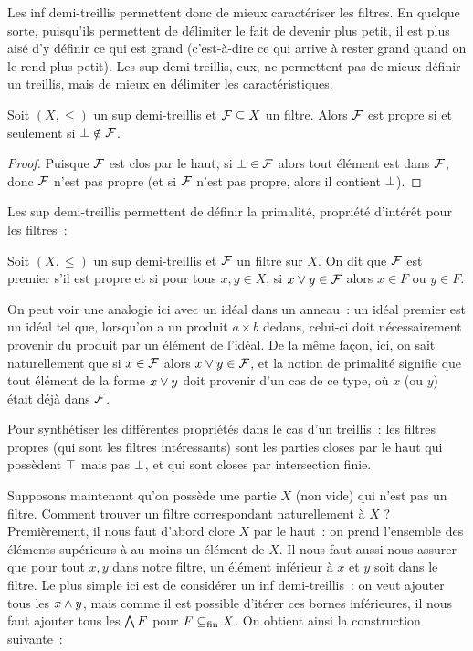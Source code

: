Les inf demi-treillis permettent donc de mieux caractériser les filtres. En
quelque sorte, puisqu'ils permettent de délimiter le fait de devenir plus petit,
il est plus aisé d'y définir ce qui est grand (c'est-à-dire ce qui arrive à
rester grand quand on le rend plus petit). Les sup demi-treillis, eux, ne
permettent pas de mieux définir un treillis, mais de mieux en délimiter les
caractéristiques.

\begin{property}
  Soit $(X,\leq)$ un sup demi-treillis et $\mathcal{F} \subseteq X$ un filtre.
  Alors $\mathcal{F}$ est propre si et seulement si $\bot\notin\mathcal{F}$.
\end{property}

\begin{proof}
  Puisque $\mathcal{F}$ est clos par le haut, si $\bot\in\mathcal{F}$ alors tout
  élément est dans $\mathcal{F}$, donc $\mathcal{F}$ n'est pas propre (et si
  $\mathcal{F}$ n'est pas propre, alors il contient $\bot$).
\end{proof}

\noindent
Les sup demi-treillis permettent de définir la primalité, propriété d'intérêt
pour les filtres~:

\begin{definition}
  Soit $(X,\leq)$ un sup demi-treillis et $\mathcal{F}$ un filtre sur $X$. On dit
  que $\mathcal{F}$ est premier s'il est propre et si pour tous $x,y\in X$, si
  $x\vee y \in \mathcal{F}$ alors $x\in F$ ou $y\in F$.
\end{definition}

On peut voir une analogie ici avec un idéal dans un anneau~: un idéal premier
est un idéal tel que, lorsqu'on a un produit $a\times b$ dedans, celui-ci doit
nécessairement provenir du produit par un élément de l'idéal. De la même façon,
ici, on sait naturellement que si $x\in\mathcal{F}$ alors
$x\vee y \in\mathcal{F}$, et la notion de primalité signifie que tout élément de
la forme $x\vee y$ doit provenir d'un cas de ce type, où $x$ (ou $y$) était
déjà dans $\mathcal{F}$.

Pour synthétiser les différentes propriétés dans le cas d'un treillis~: les
filtres propres (qui sont les filtres intéressants) sont les parties closes par
le haut qui possèdent $\top$ mais pas $\bot$, et qui sont closes par
intersection finie.

Supposons maintenant qu'on possède une partie $X$ (non vide) qui n'est pas un
filtre. Comment trouver un filtre correspondant naturellement à $X$ ?
Premièrement, il nous faut d'abord clore $X$ par le haut~: on prend l'ensemble
des éléments supérieurs à au moins un élément de $X$. Il nous faut aussi nous
assurer que pour tout $x,y$ dans notre filtre, un élément inférieur à $x$ et $y$
soit dans le filtre. Le plus simple ici est de considérer un inf demi-treillis~:
on veut ajouter tous les $x\wedge y$, mais comme il est possible d'itérer ces
bornes inférieures, il nous faut ajouter tous les $\bigwedge F$ pour
$F\subseteq_{\mathrm{fin}} X$. On obtient ainsi la construction suivante~:


